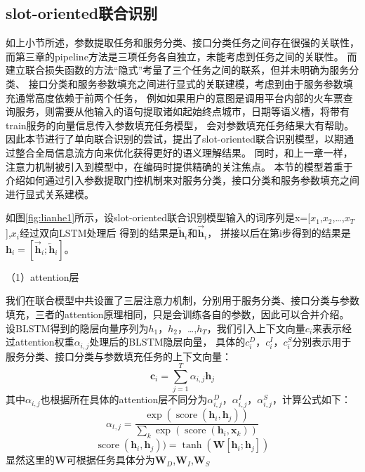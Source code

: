 \subsection{slot-oriented联合识别}
如上小节所述，参数提取任务和服务分类、接口分类任务之间存在很强的关联性，而第三章的pipeline方法是三项任务各自独立，未能考虑到任务之间的关联性。
而建立联合损失函数的方法“隐式”考量了三个任务之间的联系，但并未明确为服务分类、
接口分类和服务参数填充之间进行显式的关联建模，考虑到由于服务参数填充通常高度依赖于前两个任务，
例如如果用户的意图是调用平台内部的火车票查询服务，则需要从他输入的语句提取诸如起始终点城市，日期等语义槽，将带有train服务的向量信息传入参数填充任务模型，
会对参数填充任务结果大有帮助。
因此本节进行了单向联合识别的尝试，提出了slot-oriented联合识别模型，以期通过整合全局信息流方向来优化获得更好的语义理解结果。
同时，和上一章一样，注意力机制被引入到模型中，在编码时提供精确的关注焦点。
本节的模型着重于介绍如何通过引入参数提取门控机制来对服务分类，接口分类和服务参数填充之间进行显式关系建模。


如图\ref{fig:lianhe1}所示，设slot-oriented联合识别模型输入的词序列是x=[$x_{1}$,$x_{2}$,\dots,$x_{T}$],$x_{i}$经过双向LSTM处理后
得到的结果是$\overleftarrow{\mathbf{h}}_{i}$和$\overrightarrow{\mathbf{h}}_{i}$，
拼接以后在第i步得到的结果是$\mathbf{h}_{i}=[\overrightarrow{\mathbf{h}}_{i} ;\overleftarrow{\mathbf{h}}_{i}]$。

（1）attention层

我们在联合模型中共设置了三层注意力机制，分别用于服务分类、接口分类与参数填充，三者的attention原理相同，只是会训练各自的参数，因此可以合并介绍。
设BLSTM得到的隐层向量序列为$h_{1}$，$h_{2}$，\dots,$h_{T}$，我们引入上下文向量${c}_{i}$来表示经过attention权重$\alpha_{i,j}$处理后的BLSTM隐层向量，
具体的${c}_{i}^{D}$，${c}_{i}^{I}$，${c}_{i}^{S}$分别表示用于服务分类、接口分类与参数填充任务的上下文向量：
\begin{equation}
    \mathbf{c}_{i}=\sum_{j=1}^{T} \alpha_{i, j} \mathbf{h}_{j}
  \end{equation}
  其中$\alpha_{i, j}$也根据所在具体的attention层不同分为$\alpha_{i, j}^{D}$，$\alpha_{i, j}^{I}$，$\alpha_{i, j}^{S}$，计算公式如下：
  \begin{equation}
    \alpha_{t, j}=\frac{\exp \left(\operatorname{score}\left(\mathbf{h}_{i}, \mathbf{h}_{j}\right)\right)}{\sum_{k} \exp \left(\operatorname{score}\left(\mathbf{h}_{i}, \mathbf{x}_{k}\right)\right)}
    \end{equation}
    \begin{equation}
      \operatorname{score}(\mathbf{h}_{i}, \mathbf{h}_{j}))=\tanh \left(\mathbf{W}\left[\mathbf{h}_{i} ; \mathbf{h}_{j}\right]\right)
    \end{equation}
显然这里的$\mathbf{W}$可根据任务具体分为$\mathbf{W}_D$,$\mathbf{W}_I$,$\mathbf{W}_S$

